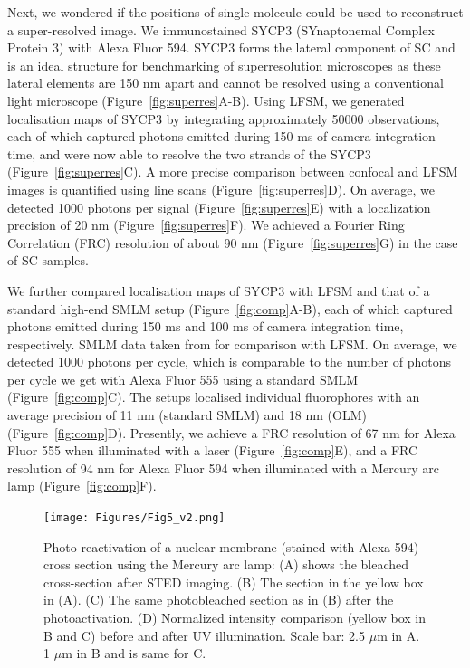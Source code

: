\documentclass[9pt,twocolumn,twoside]{pnas-new}
\begin{document}
Next, we wondered if the positions of single molecule could be used to reconstruct a super-resolved image. We immunostained SYCP3 (SYnaptonemal Complex Protein 3) with Alexa Fluor 594.  SYCP3 forms the lateral component of SC and is an ideal structure for benchmarking of superresolution microscopes as these lateral elements are 150 nm apart and cannot be resolved using a conventional light microscope (Figure~\ref{fig:superres}A-B). Using LFSM, we generated localisation maps of SYCP3 by integrating approximately 50000 observations, each of which captured photons emitted during 150 ms of camera integration time, and were now able to resolve the two strands of the SYCP3 (Figure~\ref{fig:superres}C). A more precise comparison between confocal and LFSM images is quantified using line scans (Figure~\ref{fig:superres}D).  On average, we detected 1000 photons per signal (Figure~\ref{fig:superres}E) with a localization precision of 20 nm (Figure~\ref{fig:superres}F). We achieved a Fourier Ring Correlation (FRC) resolution \citep{nieuwenhuizen2013} of about 90 nm (Figure~\ref{fig:superres}G) in the case of SC samples.

We further compared localisation maps of SYCP3 with LFSM  and that of a standard high-end SMLM setup (Figure~\ref{fig:comp}A-B), each of which captured photons emitted during 150 ms and 100 ms of camera integration time, respectively. SMLM data taken from \citep{prakash2015superresolution} for comparison with LFSM. On average, we detected 1000 photons per cycle, which is comparable to the number of photons per cycle we get with Alexa Fluor 555 using a standard SMLM (Figure~\ref{fig:comp}C). The setups localised individual fluorophores with an average precision of 11 nm (standard SMLM) and 18 nm (OLM) (Figure~\ref{fig:comp}D). Presently, we achieve a FRC resolution of 67 nm for Alexa Fluor 555 when illuminated with a laser (Figure~\ref{fig:comp}E), and a FRC resolution of 94 nm for Alexa Fluor 594 when illuminated with a Mercury arc lamp (Figure~\ref{fig:comp}F).



\begin{figure}[h!]
\begin{center}
\texttt{[image: Figures/Fig5\_v2.png]}
\end{center}
\caption[]{Photo reactivation of a nuclear membrane (stained with Alexa 594) cross section using the Mercury arc lamp:  (A) shows the bleached cross-section after STED imaging. (B) The section in the yellow box in (A). (C) The same photobleached section as in (B) after the photoactivation. (D) Normalized intensity comparison (yellow box in B and C) before and after UV illumination. Scale bar: 2.5 $\mu$m in A. 1 $\mu$m in B and is same for C. } \label{fig:dapi}
\end{figure}
\end{document}
